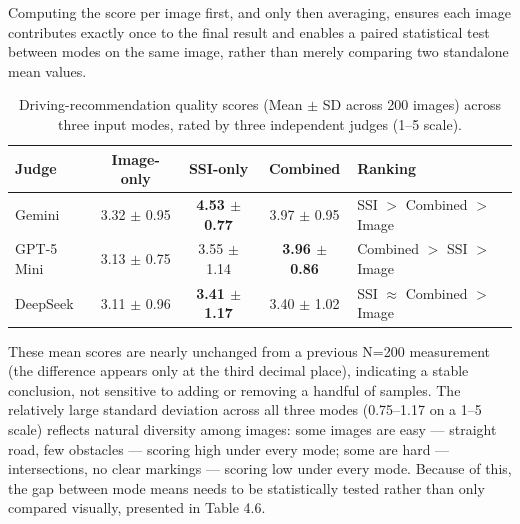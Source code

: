 \documentclass[12pt,a4paper]{report}
\begin{document}
Computing the score per image first, and only then averaging, ensures each image contributes exactly once to the final result and enables a paired statistical test between modes on the same image, rather than merely comparing two standalone mean values.

\begin{table}[htbp]
    \centering
    \small
    \caption[Driving-recommendation quality scores across three input modes]{Driving-recommendation quality scores (Mean $\pm$ SD across 200 images) across three input modes, rated by three independent judges (1--5 scale).}
    \label{tab:4.5}
    \begin{tabular}{@{}lccc p{3.4cm}@{}}
        \toprule
        \textbf{Judge} & \textbf{Image-only} & \textbf{SSI-only} & \textbf{Combined} & \textbf{Ranking} \\
        \midrule
        Gemini      & 3.32 $\pm$ 0.95 & \textbf{4.53 $\pm$ 0.77} & 3.97 $\pm$ 0.95 & SSI $>$ Combined $>$ Image \\
        GPT-5 Mini  & 3.13 $\pm$ 0.75 & 3.55 $\pm$ 1.14 & \textbf{3.96 $\pm$ 0.86} & Combined $>$ SSI $>$ Image \\
        DeepSeek    & 3.11 $\pm$ 0.96 & \textbf{3.41 $\pm$ 1.17} & 3.40 $\pm$ 1.02 & SSI $\approx$ Combined $>$ Image \\
        \bottomrule
    \end{tabular}
\end{table}

These mean scores are nearly unchanged from a previous N=200 measurement (the difference appears only at the third decimal place), indicating a stable conclusion, not sensitive to adding or removing a handful of samples. The relatively large standard deviation across all three modes (0.75--1.17 on a 1--5 scale) reflects natural diversity among images: some images are easy --- straight road, few obstacles --- scoring high under every mode; some are hard --- intersections, no clear markings --- scoring low under every mode. Because of this, the gap between mode means needs to be statistically tested rather than only compared visually, presented in Table 4.6.
\end{document}
